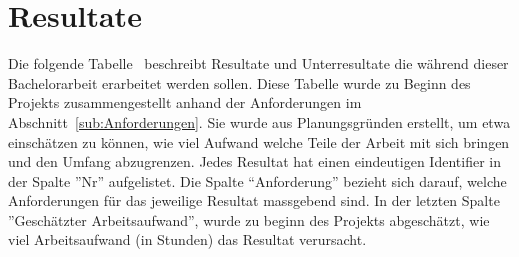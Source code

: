 % 


% 


\label{ch:assignment}

\chapter{Resultate}\label{ch:resultate}

Die folgende Tabelle~ beschreibt Resultate und Unterresultate die während dieser Bachelorarbeit erarbeitet werden sollen.
Diese Tabelle wurde zu Beginn des Projekts zusammengestellt anhand der Anforderungen im Abschnitt~\ref{sub:Anforderungen}.
Sie wurde aus Planungsgründen erstellt, um etwa einschätzen zu können, wie viel Aufwand welche Teile der Arbeit mit sich bringen und den Umfang abzugrenzen.
Jedes Resultat hat einen eindeutigen Identifier in  der Spalte ''Nr'' aufgelistet.
Die Spalte ``Anforderung'' bezieht sich darauf, welche Anforderungen für das jeweilige Resultat massgebend sind.
In der letzten Spalte ''Geschätzter Arbeitsaufwand'', wurde zu beginn des Projekts abgeschätzt, wie viel Arbeitsaufwand (in Stunden) das Resultat verursacht.

